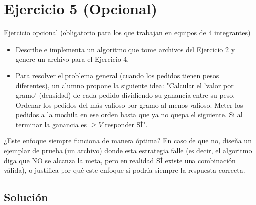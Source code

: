 \section{Ejercicio 5 (Opcional)}

\begin{tcolorbox}[enunciado]
Ejercicio opcional (obligatorio para los que trabajan en equipos de 4 integrantes)
\begin{itemize}[leftmargin=*]
    \item Describe e implementa un algoritmo que tome archivos del Ejercicio 2 y genere un archivo para el Ejercicio 4.
    \item Para resolver el problema general (cuando los pedidos tienen pesos diferentes), un alumno propone la siguiente idea: "Calcular el 'valor por gramo' (densidad) de cada pedido dividiendo su ganancia entre su peso. Ordenar los pedidos del más valioso por gramo al menos valioso. Meter los pedidos a la mochila en ese orden hasta que ya no quepa el siguiente. Si al terminar la ganancia es $\ge V$ responder SÍ".
\end{itemize}

¿Este enfoque siempre funciona de manera óptima? En caso de que no, diseña un ejemplar de prueba (un archivo) donde esta estrategia falle (es decir, el algoritmo diga que NO se alcanza la meta, pero en realidad SÍ existe una combinación válida), o justifica por qué este enfoque si podría siempre la respuesta correcta.
\end{tcolorbox}

\subsection{Solución}
